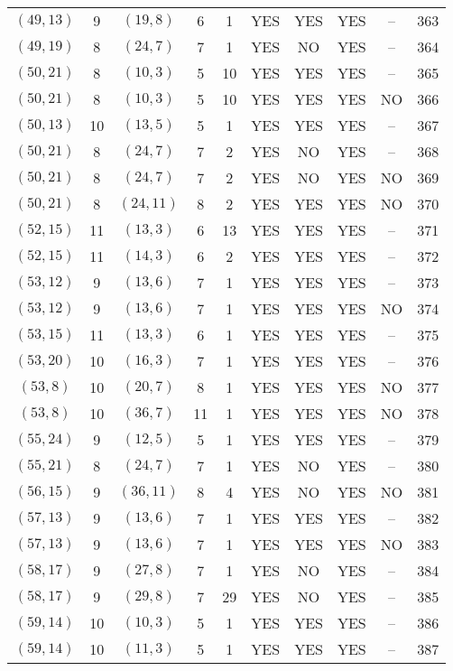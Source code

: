 \begin{longtable}{|c|c|c|c|c|c|c|c|c|c|}
$(49, 13)$ & 9 & $(19, 8)$ & 6 & 1 & YES & YES & YES & -- & 363\\
$(49, 19)$ & 8 & $(24, 7)$ & 7 & 1 & YES & NO & YES & -- & 364\\
$(50, 21)$ & 8 & $(10, 3)$ & 5 & 10 & YES & YES & YES & -- & 365\\
$(50, 21)$ & 8 & $(10, 3)$ & 5 & 10 & YES & YES & YES & NO & 366\\
$(50, 13)$ & 10 & $(13, 5)$ & 5 & 1 & YES & YES & YES & -- & 367\\
$(50, 21)$ & 8 & $(24, 7)$ & 7 & 2 & YES & NO & YES & -- & 368\\
$(50, 21)$ & 8 & $(24, 7)$ & 7 & 2 & YES & NO & YES & NO & 369\\
$(50, 21)$ & 8 & $(24, 11)$ & 8 & 2 & YES & YES & YES & NO & 370\\
$(52, 15)$ & 11 & $(13, 3)$ & 6 & 13 & YES & YES & YES & -- & 371\\
$(52, 15)$ & 11 & $(14, 3)$ & 6 & 2 & YES & YES & YES & -- & 372\\
$(53, 12)$ & 9 & $(13, 6)$ & 7 & 1 & YES & YES & YES & -- & 373\\
$(53, 12)$ & 9 & $(13, 6)$ & 7 & 1 & YES & YES & YES & NO & 374\\
$(53, 15)$ & 11 & $(13, 3)$ & 6 & 1 & YES & YES & YES & -- & 375\\
$(53, 20)$ & 10 & $(16, 3)$ & 7 & 1 & YES & YES & YES & -- & 376\\
$(53, 8)$ & 10 & $(20, 7)$ & 8 & 1 & YES & YES & YES & NO & 377\\
$(53, 8)$ & 10 & $(36, 7)$ & 11 & 1 & YES & YES & YES & NO & 378\\
$(55, 24)$ & 9 & $(12, 5)$ & 5 & 1 & YES & YES & YES & -- & 379\\
$(55, 21)$ & 8 & $(24, 7)$ & 7 & 1 & YES & NO & YES & -- & 380\\
$(56, 15)$ & 9 & $(36, 11)$ & 8 & 4 & YES & NO & YES & NO & 381\\
$(57, 13)$ & 9 & $(13, 6)$ & 7 & 1 & YES & YES & YES & -- & 382\\
$(57, 13)$ & 9 & $(13, 6)$ & 7 & 1 & YES & YES & YES & NO & 383\\
$(58, 17)$ & 9 & $(27, 8)$ & 7 & 1 & YES & NO & YES & -- & 384\\
$(58, 17)$ & 9 & $(29, 8)$ & 7 & 29 & YES & NO & YES & -- & 385\\
$(59, 14)$ & 10 & $(10, 3)$ & 5 & 1 & YES & YES & YES & -- & 386\\
$(59, 14)$ & 10 & $(11, 3)$ & 5 & 1 & YES & YES & YES & -- & 387\\

\end{longtable}
